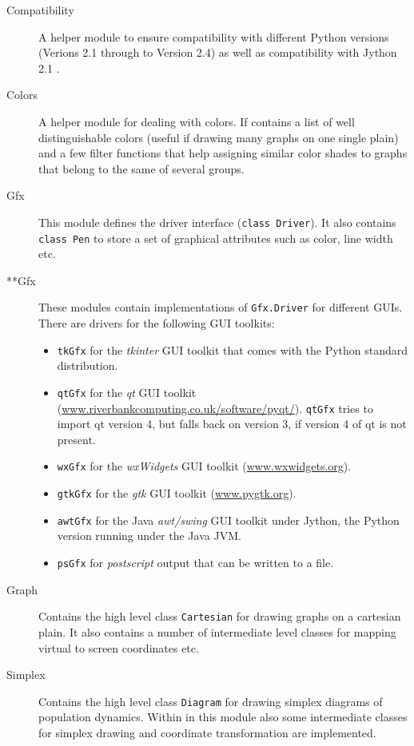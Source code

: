\documentclass[12pt,a4paper,USenglish]{article}
\begin{document}
\begin{description}

\item[Compatibility] A helper module to ensure compatibility
with different Python versions (Verions 2.1 through to Version 2.4) as
well as compatibility with Jython 2.1 .  

\item[Colors] A helper module for dealing with colors. If contains a
list of well distinguishable colors (useful if drawing many graphs on
one single plain) and a few filter functions that help assigning
similar color shades to graphs that belong to the same of several
groups.  

\item[Gfx] This module defines the driver interface
({\tt class Driver}). It also contains {\tt class Pen} to store a set 
of graphical attributes such as color, line width etc.

\item[**Gfx] These modules contain implementations of 
{\tt Gfx.Driver} for different GUIs. There are drivers for the following GUI
toolkits: 
  \begin{itemize}
    \item {\tt tkGfx} for the {\em tkinter} GUI toolkit that
          comes with the Python standard distribution.
    \item {\tt qtGfx} for the {\em qt} GUI toolkit
          (\url{www.riverbankcomputing.co.uk/software/pyqt/}).
          {\tt qtGfx} tries to import qt version 4, but falls
          back on version 3, if version 4 of qt is not present. 
    \item {\tt wxGfx} for the {\em wxWidgets} GUI
          toolkit (\url{www.wxwidgets.org}). 
    \item {\tt gtkGfx} for the {\em gtk} GUI toolkit (\url{www.pygtk.org}).
    \item {\tt awtGfx} for the Java {\em awt/swing} GUI toolkit under Jython,
          the Python version running under the Java JVM.
    \item {\tt psGfx} for {\em postscript} output that can be written
          to a file.
  \end{itemize}

\item[Graph] Contains the high level class {\tt Cartesian} for drawing
  graphs on a cartesian plain. It also contains a number of
  intermediate level classes for mapping virtual to screen coordinates
  etc.

\item[Simplex] Contains the high level class {\tt Diagram} for drawing
  simplex diagrams of population dynamics. Within in this module also
  some intermediate classes for simplex drawing and coordinate
  transformation are implemented.

\end{description}
\end{document}
